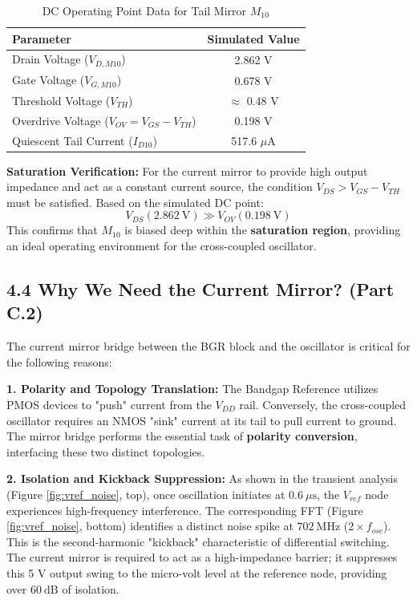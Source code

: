\documentclass[12pt]{article}
\begin{document}
\begin{table}[h]
\centering
\caption{DC Operating Point Data for Tail Mirror $M_{10}$}
\label{tab:op_mirror}
\begin{tabular}{lc}
\toprule
\textbf{Parameter} & \textbf{Simulated Value} \\ \midrule
Drain Voltage ($V_{D,M10}$) & 2.862 V \\
Gate Voltage ($V_{G,M10}$) & 0.678 V \\
Threshold Voltage ($V_{TH}$) & $\approx$ 0.48 V \\
Overdrive Voltage ($V_{OV} = V_{GS} - V_{TH}$) & 0.198 V \\
Quiescent Tail Current ($I_{D10}$) & 517.6 $\mu$A \\
\bottomrule
\end{tabular}
\end{table}

\noindent
\textbf{Saturation Verification:} 
For the current mirror to provide high output impedance and act as a constant current source, the condition $V_{DS} > V_{GS} - V_{TH}$ must be satisfied. Based on the simulated DC point:
\begin{equation}
V_{DS} (2.862~\text{V}) \gg V_{OV} (0.198~\text{V})
\end{equation}
This confirms that $M_{10}$ is biased deep within the \textbf{saturation region}, providing an ideal operating environment for the cross-coupled oscillator.

\subsection*{4.4 Why We Need the Current Mirror? (Part C.2)}
The current mirror bridge between the BGR block and the oscillator is critical for the following reasons:

\noindent
\textbf{1. Polarity and Topology Translation:} 
The Bandgap Reference utilizes PMOS devices to "push" current from the $V_{DD}$ rail. Conversely, the cross-coupled oscillator requires an NMOS "sink" current at its tail to pull current to ground. The mirror bridge performs the essential task of \textbf{polarity conversion}, interfacing these two distinct topologies.

\noindent
\textbf{2. Isolation and Kickback Suppression:} 
As shown in the transient analysis (Figure \ref{fig:vref_noise}, top), once oscillation initiates at $0.6~\mu\text{s}$, the $V_{ref}$ node experiences high-frequency interference. The corresponding FFT (Figure \ref{fig:vref_noise}, bottom) identifies a distinct noise spike at $702~\text{MHz}$ ($2 \times f_{osc}$). This is the second-harmonic "kickback" characteristic of differential switching. The current mirror is required to act as a high-impedance barrier; it suppresses this 5 V output swing to the micro-volt level at the reference node, providing over $60~\text{dB}$ of isolation.
\end{document}
